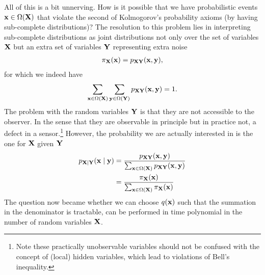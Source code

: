 All of this is a bit unnerving. How is it possible that we have probabilistic events $\mathbf{x}\in \Omega(\mathbf{X})$ that violate the second of Kolmogorov's probability axioms (by having sub-complete distributions)? The resolution to this problem lies in interpreting sub-complete distributions as joint distributions not only over the set of variables $\mathbf{X}$ but an extra set of variables $\mathbf{Y}$ representing extra noise~\citep{wiseman2009quantum}
\begin{align}
	\pi_{\mathbf{X}}(\mathbf{x}) = p_{\mathbf{X} \mathbf{Y}}(\mathbf{x}, \mathbf{y}),
\end{align}
for which we indeed have
\begin{align}
	\sum_{\mathbf{x}\in \Omega(\mathbf{X})} \sum_{\mathbf{y}\in \Omega(\mathbf{Y})}  p_{\mathbf{X} \mathbf{Y}}(\mathbf{x}, \mathbf{y}) =1.
\end{align}
The problem with the random variables $\mathbf{Y}$ is that they are not accessible to the observer. In the sense that they are observable in principle but in practice not, \eg a defect in a sensor.\footnote{Note these practically unobservable variables should not be confused with the concept of (local) hidden variables, which lead to violations of Bell's inequality.}
However, the probability we are actually interested in is the one for $\mathbf{X}$ given $\mathbf{Y}$
\begin{align}
	p_{\mathbf{X}|\mathbf{Y}}(\mathbf{x}\mid \mathbf{y} )
	 & =
	\frac{
	p_{\mathbf{X} \mathbf{Y}}(\mathbf{x},  \mathbf{y} )
	}
	{
	\sum_{\mathbf{x}\in \Omega(\mathbf{X})}p_{\mathbf{X} \mathbf{Y}}(\mathbf{x}, \mathbf{y} )
	}
	\nonumber
	\\
	 & = \frac{\pi_{\mathbf{X}}(\mathbf{x})}{\sum_{\mathbf{x}\in \Omega(\mathbf{X})}  \pi_{\mathbf{X}}(\mathbf{x})}
\end{align}
The question now became whether we can choose $q(\mathbf{x})$ such that the summation in the denominator is tractable, \ie can be performed in time polynomial in the number of random variables $\mathbf{X}$.


